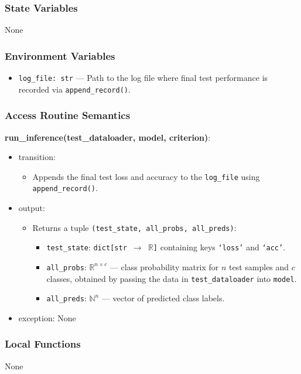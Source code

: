 \documentclass[12pt, titlepage]{article}
\begin{document}
\subsubsection{State Variables}
None

\subsubsection{Environment Variables}
\begin{itemize}
  \item \texttt{log\_file: str} — Path to the log file where final test performance is recorded via \texttt{append\_record()}.
\end{itemize}

\subsubsection{Access Routine Semantics}

\noindent \textbf{run\_inference(test\_dataloader, model, criterion)}:
\begin{itemize}
  \item transition:
  \begin{itemize}
    \item Appends the final test loss and accuracy to the \texttt{log\_file} using \texttt{append\_record()}.
  \end{itemize}
  \item output:
  \begin{itemize}
    \item Returns a tuple \texttt{(test\_state, all\_probs, all\_preds)}:
    \begin{itemize}
      \item \texttt{test\_state}: \texttt{dict[str $\rightarrow$ \(\mathbb{R}\)]} containing keys \texttt{`loss'} and \texttt{`acc'}.
      \item \texttt{all\_probs}: \(\mathbb{R}^{n \times c}\) — class probability matrix for \(n\) test samples and \(c\) classes, obtained by passing the data in \texttt{test\_dataloader} into \texttt{model}.
      \item \texttt{all\_preds}: \(\mathbb{N}^n\) — vector of predicted class labels.
    \end{itemize}
  \end{itemize}
  \item exception: None
\end{itemize}

\subsubsection{Local Functions}
None
\end{document}
